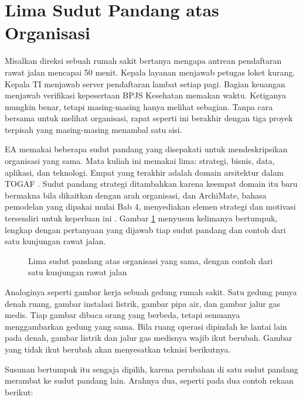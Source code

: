 \section{Lima Sudut Pandang atas Organisasi}

Misalkan direksi sebuah rumah sakit bertanya mengapa antrean pendaftaran
rawat jalan mencapai 50 menit. Kepala layanan menjawab petugas loket kurang.
Kepala TI menjawab server pendaftaran lambat setiap pagi. Bagian keuangan
menjawab verifikasi kepesertaan BPJS Kesehatan memakan waktu. Ketiganya mungkin
benar, tetapi masing-masing hanya melihat sebagian. Tanpa cara bersama untuk
melihat organisasi, rapat seperti ini berakhir dengan tiga proyek terpisah
yang masing-masing menambal satu sisi.

EA memakai beberapa sudut pandang yang disepakati untuk mendeskripsikan
organisasi yang sama. Mata kuliah ini memakai lima: strategi, bisnis, data,
aplikasi, dan teknologi. Empat yang terakhir adalah domain arsitektur dalam
TOGAF \cite{togaf10}. Sudut pandang strategi ditambahkan karena keempat domain
itu baru bermakna bila dikaitkan dengan arah organisasi, dan ArchiMate, bahasa
pemodelan yang dipakai mulai Bab 4, menyediakan elemen strategi dan motivasi
tersendiri untuk keperluan ini \cite{archimate32}. Gambar \ref{fig:ch01-lima}
menyusun kelimanya bertumpuk, lengkap dengan pertanyaan yang dijawab tiap
sudut pandang dan contoh dari satu kunjungan rawat jalan.

\begin{figure}[!htb]
  \centering
  
  \caption{Lima sudut pandang atas organisasi yang sama, dengan contoh dari satu
           kunjungan rawat jalan}
  \label{fig:ch01-lima}
\end{figure}

Analoginya seperti gambar kerja sebuah gedung rumah sakit. Satu gedung punya
denah ruang, gambar instalasi listrik, gambar pipa air, dan gambar jalur gas
medis. Tiap gambar dibaca orang yang berbeda, tetapi semuanya menggambarkan
gedung yang sama. Bila ruang operasi dipindah ke lantai lain pada denah,
gambar listrik dan jalur gas medisnya wajib ikut berubah. Gambar yang tidak
ikut berubah akan menyesatkan teknisi berikutnya.

Susunan bertumpuk itu sengaja dipilih, karena perubahan di satu sudut pandang
merambat ke sudut pandang lain. Arahnya dua, seperti pada dua contoh rekaan
berikut:

